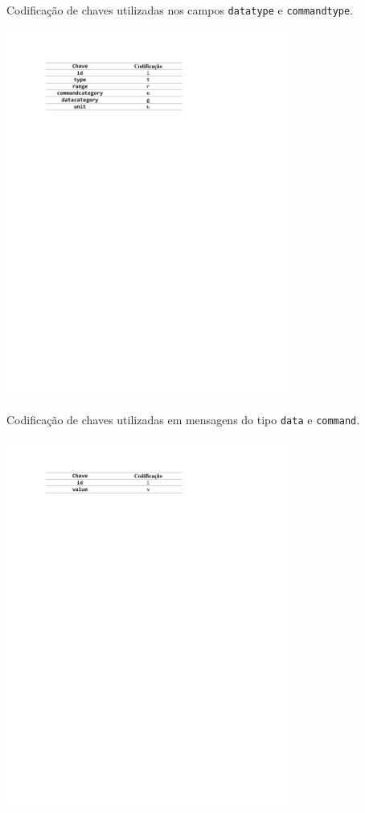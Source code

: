 \begin{table}[hp]
	\caption{Codificação de chaves utilizadas nos campos \texttt{datatype} e \texttt{commandtype}.}\smallskip
	\label{tab:codificacao_tipo_dc}
	\includegraphics[width=0.7\textwidth]{tabelas/codificacao_tipo_dc.pdf}
	
	\caption{Codificação de chaves utilizadas em mensagens do tipo \texttt{data} e \texttt{command}.}\smallskip
	\label{tab:codificacao_dc}
	\includegraphics[width=0.7\textwidth]{tabelas/codificacao_dc.pdf}
	
\end{table}

